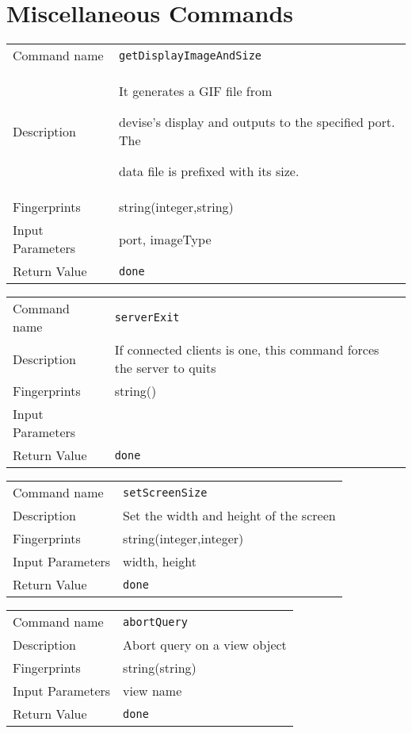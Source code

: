 \section{Miscellaneous Commands}
\noindent
\begin{tabular}{l|p{5in}}
\hline
Command name &{\tt getDisplayImageAndSize }\\ 
Description &
It generates a GIF file from
 
devise's display and outputs to the specified port. The
 
data file is prefixed with its size.
 	\\
Fingerprints & string(integer,string)\\
Input Parameters&port, imageType\\
Return Value&{\tt done}\\
\hline
\end{tabular}
\bigskip

\noindent
\begin{tabular}{l|p{5in}}
\hline
Command name &{\tt serverExit }\\ 
Description &
If connected clients is one, this command forces the server to quits
 	\\
Fingerprints & string()\\
Input Parameters&\\
Return Value&{\tt done}\\
\hline
\end{tabular}
\bigskip

\noindent
\begin{tabular}{l|p{5in}}
\hline
Command name &{\tt setScreenSize }\\ 
Description &
Set the width and height of the screen
 	\\
Fingerprints & string(integer,integer)\\
Input Parameters&width, height\\
Return Value&{\tt done}\\
\hline
\end{tabular}
\bigskip

\noindent
\begin{tabular}{l|p{5in}}
\hline
Command name &{\tt abortQuery }\\ 
Description &
Abort query on a view object
 	\\
Fingerprints & string(string)\\
Input Parameters&view name\\
Return Value&{\tt done}\\
\hline
\end{tabular}
\bigskip

